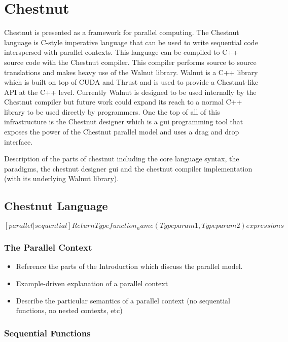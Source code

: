 \section{Chestnut}

Chestnut is presented as a framework for parallel computing. The Chestnut language is C-style imperative language that can be used to write sequential code interspersed with parallel contexts. This language can be compiled to C++ source code with the Chestnut compiler. This compiler performs source to source translations and makes heavy use of the Walnut library. Walnut is a C++ library which is built on top of CUDA and Thrust and is used to provide a Chestnut-like API at the C++ level. Currently Walnut is designed to be used internally by the Chestnut compiler but future work could expand its reach to a normal C++ library to be used directly by programmers. One the top of all of this infrastructure is the Chestnut designer which is a gui programming tool that exposes the power of the Chestnut parallel model and uses a drag and drop interface.

Description of the parts of chestnut including the core language syntax, the paradigms, the chestnut designer gui and the chestnut compiler implementation (with its underlying Walnut library).

\subsection{Chestnut Language}

$[parallel|sequential] ReturnType function_name(Type param1, Type param2) { expressions }$
$$

\subsubsection{The Parallel Context}

\begin{itemize}
\item Reference the parts of the Introduction which discuss the parallel model.  
\item Example-driven explanation of a parallel context
\item Describe the particular semantics of a parallel context (no sequential functions, no nested contexts, etc)
\end{itemize}

\subsubsection{Sequential Functions}

